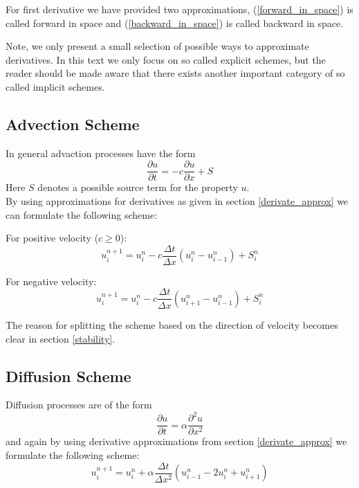 \documentclass[]{article}
\begin{document}
For first derivative we have provided two approximations, (\ref{forward_in_space}) is called
forward in space and (\ref{backward_in_space}) is called backward in space.

Note, we only present a small selection of possible ways to approximate derivatives. In  this text we only focus on so called explicit schemes, but the reader should be made aware that there exists another important category of so called implicit schemes.

\subsection{Advection Scheme}

In general advaction processes have the form
\begin{equation*}
\frac{\partial u}{\partial t} = -c \frac{\partial u}{\partial x} + S
\end{equation*}
Here $S$ denotes a possible source term for the property $u$.\\
By using approximations for derivatives as given in section \ref{derivate_approx}
we can formulate the following scheme:

For positive velocity ($c\geq 0$):
\begin{equation} \label{advection_scheme_upwind}
u_{i}^{n+1}=u_{i}^{n}-c\frac{\Delta t}{\Delta x} (u_{i}^{n}-u_{i-1}^{n}) + S_{i}^{n}
\end{equation}

For negative velocity:
\begin{equation} \label{advection_scheme_downwind}
u_{i}^{n+1}=u_{i}^{n}-c\frac{\Delta t}{\Delta x} (u_{i+1}^{n}-u_{i-1}^{n}) +S_{i}^{n}
\end{equation}

The reason for splitting the scheme based on the direction of velocity becomes clear in section \ref{stability}.

\subsection{Diffusion Scheme}
Diffusion processes are of the form
\begin{equation*}
\frac{\partial u}{\partial t} = \alpha \frac{\partial^2 u}{\partial x^2}
\end{equation*}
and again by using derivative approximations from section \ref{derivate_approx} we
formulate the following scheme:
\begin{equation} \label{diffusion_scheme}
u_{i}^{n+1}=u_{i}^ {n}+\alpha\frac{\Delta t}{\Delta x^{2}} (u_{i-1}^{n}-2u_{i}^{n}+u_{i+1}^{n})
\end{equation}
\end{document}

